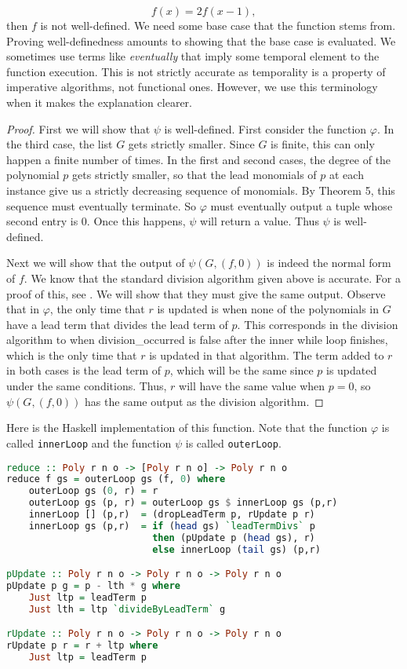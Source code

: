 \documentclass[MS, xcolor=dvipsnames]{wfuthesis}
\theoremstyle{definition}
\def\p{\varphi}
\begin{document}
\[ f(x) = 2f(x-1), \]
then $f$ is not well-defined. We need some base case that the function stems from. Proving well-definedness amounts to showing that the base case is evaluated. We sometimes use terms like \emph{eventually} that imply some temporal element to the function execution. This is not strictly accurate as temporality is a property of imperative algorithms, not functional ones. However, we use this terminology when it makes the explanation clearer.
\begin{proof}%
  First we will show that $\psi$ is well-defined. First consider the function $\p$. In the third case, the list $G$ gets strictly smaller. Since $G$ is finite, this can only happen a finite number of times. In the first and second cases, the degree of the polynomial $p$ gets strictly smaller, so that the lead monomials of $p$ at each instance give us a strictly decreasing sequence of monomials. By Theorem 5, this sequence must eventually terminate. So $\p$ must eventually output a tuple whose second entry is 0. Once this happens, $\psi$ will return a value. Thus $\psi$ is well-defined. \par
  Next we will show that the output of $\psi(G,(f,0))$ is indeed the normal form of $f$. We know that the standard division algorithm given above is accurate. For a proof of this, see \cite{Cox2015}. We will show that they must give the same output. Observe that in $\p$, the only time that $r$ is updated is when none of the polynomials in $G$ have a lead term that divides the lead term of $p$. This corresponds in the division algorithm to when division\_occurred is false after the inner while loop finishes, which is the only time that $r$ is updated in that algorithm. The term added to $r$ in both cases is the lead term of $p$, which will be the same since $p$ is updated under the same conditions. Thus, $r$ will have the same value when $p=0$, so $\psi(G,(f,0))$ has the same output as the division algorithm.
\end{proof}
Here is the Haskell implementation of this function. Note that the function $\p$ is called \lstinline{innerLoop} and the function $\psi$ is called \lstinline{outerLoop}.
\begin{lstlisting}[language=Haskell]
reduce :: Poly r n o -> [Poly r n o] -> Poly r n o
reduce f gs = outerLoop gs (f, 0) where
    outerLoop gs (0, r) = r
    outerLoop gs (p, r) = outerLoop gs $ innerLoop gs (p,r)
    innerLoop [] (p,r)  = (dropLeadTerm p, rUpdate p r)
    innerLoop gs (p,r)  = if (head gs) `leadTermDivs` p
                          then (pUpdate p (head gs), r)
                          else innerLoop (tail gs) (p,r)

pUpdate :: Poly r n o -> Poly r n o -> Poly r n o
pUpdate p g = p - lth * g where
    Just ltp = leadTerm p
    Just lth = ltp `divideByLeadTerm` g

rUpdate :: Poly r n o -> Poly r n o -> Poly r n o
rUpdate p r = r + ltp where
    Just ltp = leadTerm p
\end{lstlisting}
\end{document}

